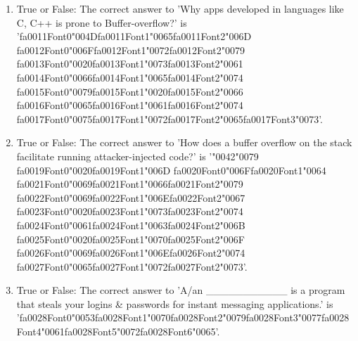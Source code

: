\documentclass[12pt]{article}
\begin{document}
\begin{enumerate}[label=\arabic*.]
\item True or False: The correct answer to 'Why apps developed in languages like C, C++ is prone to Buffer-overflow?' is '{\csname fa0011Font0\endcsname\char"004D}{\csname fa0011Font1\endcsname\char"0065}{\csname fa0011Font2\endcsname\char"006D} {\csname fa0012Font0\endcsname\char"006F}{\csname fa0012Font1\endcsname\char"0072}{\csname fa0012Font2\endcsname\char"0079} {\csname fa0013Font0\endcsname\char"0020}{\csname fa0013Font1\endcsname\char"0073}{\csname fa0013Font2\endcsname\char"0061} {\csname fa0014Font0\endcsname\char"0066}{\csname fa0014Font1\endcsname\char"0065}{\csname fa0014Font2\endcsname\char"0074} {\csname fa0015Font0\endcsname\char"0079}{\csname fa0015Font1\endcsname\char"0020}{\csname fa0015Font2\endcsname\char"0066} {\csname fa0016Font0\endcsname\char"0065}{\csname fa0016Font1\endcsname\char"0061}{\csname fa0016Font2\endcsname\char"0074} {\csname fa0017Font0\endcsname\char"0075}{\csname fa0017Font1\endcsname\char"0072}{\csname fa0017Font2\endcsname\char"0065}{\csname fa0017Font3\endcsname\char"0073}'.
\item True or False: The correct answer to 'How does a buffer overflow on the stack facilitate running attacker-injected code?' is '{\char"0042}{\char"0079} {\csname fa0019Font0\endcsname\char"0020}{\csname fa0019Font1\endcsname\char"006D} {\csname fa0020Font0\endcsname\char"006F}{\csname fa0020Font1\endcsname\char"0064} {\csname fa0021Font0\endcsname\char"0069}{\csname fa0021Font1\endcsname\char"0066}{\csname fa0021Font2\endcsname\char"0079} {\csname fa0022Font0\endcsname\char"0069}{\csname fa0022Font1\endcsname\char"006E}{\csname fa0022Font2\endcsname\char"0067} {\csname fa0023Font0\endcsname\char"0020}{\csname fa0023Font1\endcsname\char"0073}{\csname fa0023Font2\endcsname\char"0074} {\csname fa0024Font0\endcsname\char"0061}{\csname fa0024Font1\endcsname\char"0063}{\csname fa0024Font2\endcsname\char"006B} {\csname fa0025Font0\endcsname\char"0020}{\csname fa0025Font1\endcsname\char"0070}{\csname fa0025Font2\endcsname\char"006F} {\csname fa0026Font0\endcsname\char"0069}{\csname fa0026Font1\endcsname\char"006E}{\csname fa0026Font2\endcsname\char"0074} {\csname fa0027Font0\endcsname\char"0065}{\csname fa0027Font1\endcsname\char"0072}{\csname fa0027Font2\endcsname\char"0073}'.
\item True or False: The correct answer to 'A/an \_\_\_\_\_\_\_\_\_\_\_ is a program that steals your logins \& passwords for instant messaging applications.' is '{\csname fa0028Font0\endcsname\char"0053}{\csname fa0028Font1\endcsname\char"0070}{\csname fa0028Font2\endcsname\char"0079}{\csname fa0028Font3\endcsname\char"0077}{\csname fa0028Font4\endcsname\char"0061}{\csname fa0028Font5\endcsname\char"0072}{\csname fa0028Font6\endcsname\char"0065}'.

\end{enumerate}
\end{document}
